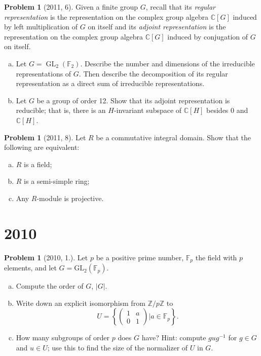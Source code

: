 \documentclass{article}
\newcommand{\inv}{^{-1}}
\newcommand{\<}{\langle} %
\renewcommand{\>}{\rangle} %
\DeclareMathOperator{\GL}{GL}
\theoremstyle{plain}
\theoremstyle{remark}
\theoremstyle{definition}
\newtheorem{examproblem}[equation]{Problem}
\begin{document}
\begin{examproblem}[2011, 6]
	Given a finite group $G$, recall that its \textit{regular representation}
	is the representation on the complex group algebra $\mathbb C[G]$ induced by
	left multiplication of $G$ on itself and its \textit{adjoint representation}
	is the representation on the complex group algebra $\mathbb C[G]$ induced
	by conjugation of $G$ on itself.
	\begin{enumerate}[(a)]
		\item Let $G=\GL_2(\mathbb F_2)$. Describe the number and dimensions of
			the irreducible representations of $G$. Then describe the
			decomposition of its regular representation as a direct
			sum of irreducible representations.
		\item Let $G$ be a group of order 12. Show that its adjoint
			representation is reducible; that is, there is
			an $H$-invariant subspace of $\mathbb C[H]$ besides 0 and
			$\mathbb C[H]$.
	\end{enumerate}
\end{examproblem}

\begin{examproblem}[2011, 8]
	Let $R$ be a commutative integral domain. Show that the following
	are equivalent:
	\begin{enumerate}[(a)]
		\item $R$ is a field;
		\item $R$ is a semi-simple ring;
		\item Any $R$-module is projective.
	\end{enumerate}
\end{examproblem}

\newpage

\section{2010}

\begin{examproblem}[2010, 1.]
	Let $p$ be a positive prime number, $\mathbb F_p$ the field with $p$ elements,
	and let $G=\text{GL}_2(\mathbb F_p)$.
	\begin{enumerate}[(a)]
		\item Compute the order of $G$, $|G|$.
		\item Write down an explicit isomorphism from $\mathbb Z/p\mathbb Z$ to
			$$
			U=\left\{
			\begin{pmatrix}
				1 & a\\
				0 & 1
			\end{pmatrix}
			\bigg|a\in\mathbb F_p\right\}.
			$$
		\item How many subgroups of order $p$ does $G$ have? Hint:
			compute $gug\inv$ for $g\in G$ and $u\in U$; use this
			to find the size of the normalizer of $U$ in $G$.
	\end{enumerate}
\end{examproblem}
\end{document}
